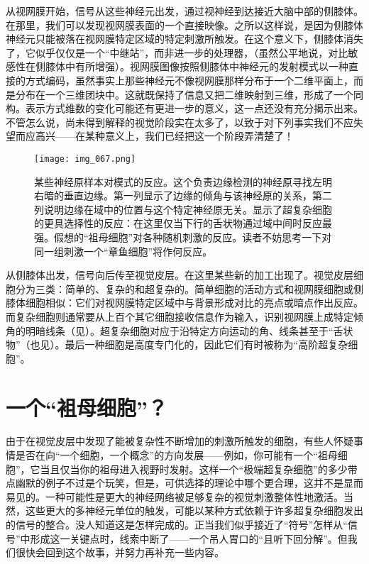 从视网膜开始，信号从这些神经元出发，通过视神经到达接近大脑中部的侧膝体。在那里，我们可以发现视网膜表面的一个直接映像。之所以这样说，是因为侧膝体神经元只能被落在视网膜特定区域的特定刺激所触发。在这个意义下，侧膝体消失了，它似乎仅仅是一个“中继站”，而非进一步的处理器，（虽然公平地说，对比敏感性在侧膝体中有所增强）。视网膜图像按照侧膝体中神经元的发射模式以一种直接的方式编码，虽然事实上那些神经元不像视网膜那样分布于一个二维平面上，而是分布在一个三维团块中。这就既保持了信息又把二维映射到三维，形成了一个同构。表示方式维数的变化可能还有更进一步的意义，这一点还没有充分揭示出来。不管怎么说，尚未得到解释的视觉阶段实在太多了，以致于对下列事实我们不应失望而应高兴——在某种意义上，我们已经把这一个阶段弄清楚了！

\begin{figure}
\texttt{[image: img\_067.png]}
\caption[某些神经元样本对模式的反应。]
  {某些神经原样本对模式的反应。这个负责边缘检测的神经原寻找左明右暗的垂直边缘。第一列显示了边缘的倾角与该神经原的关系，第二列说明边缘在域中的位置与这个特定神经原无关。显示了超复杂细胞的更具选择性的反应：在这里仅当下行的舌状物通过域中间时反应最强。假想的“祖母细胞”对各种随机刺激的反应。读者不妨思考一下对同一组刺激一个“章鱼细胞”将作何反应。}
\end{figure}

从侧膝体出发，信号向后传至视觉皮层。在这里某些新的加工出现了。视觉皮层细胞分为三类：简单的、复杂的和超复杂的。简单细胞的活动方式和视网膜细胞或侧膝体细胞相似：它们对视网膜特定区域中与背景形成对比的亮点或暗点作出反应。而复杂细胞则通常要从上百个其它细胞接收信息作为输入，识别视网膜上成特定倾角的明暗线条（见）。超复杂细胞对应于沿特定方向运动的角、线条甚至于“舌状物”（也见）。最后一种细胞是高度专门化的，因此它们有时被称为“高阶超复杂细胞”。

\section{一个“袓母细胞”？}

由于在视觉皮层中发现了能被复杂性不断增加的刺激所触发的细胞，有些人怀疑事情是否在向“一个细胞，一个概念”的方向发展——例如，你可能有一个“祖母细胞”，它当且仅当你的祖母进入视野时发射。这样一个“极端超复杂细胞”的多少带点幽默的例子不过是个玩笑，但是，可供选择的理论中哪个更合理，这并不是显而易见的。一种可能性是更大的神经网络被足够复杂的视觉刺激整体性地激活。当然，这些更大的多神经元单位的触发，可能以某种方式依赖于许多超复杂细胞发出的信号的整合。没人知道这是怎样完成的。正当我们似乎接近了“符号”怎样从“信号”中形成这一关键点时，线索中断了——一个吊人胃口的“且听下回分解”。但我们很快会回到这个故事，并努力再补充一些内容。

